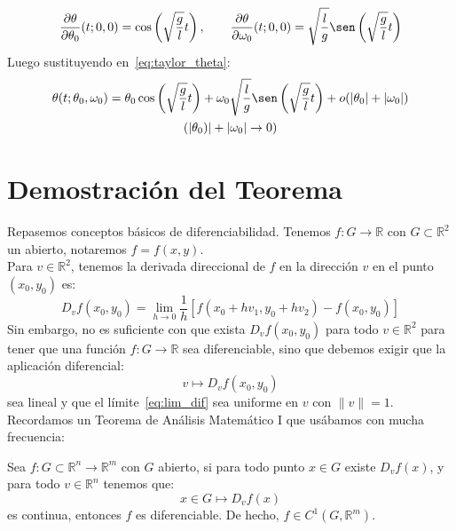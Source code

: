 \begin{equation*}
    \frac{\partial \theta}{\partial \theta_0}(t;0,0) = \cos\left(\sqrt{\frac{g}{l}}t\right), \qquad \frac{\partial \theta}{\partial \omega_0}(t;0,0) = \sqrt{\frac{l}{g}}\sen\left(\sqrt{\frac{g}{l}}t\right)
\end{equation*}
Luego sustituyendo en~\eqref{eq:taylor_theta}:
\begin{multline*}
    \theta(t;\theta_0,\omega_0) = \theta_0\cos\left(\sqrt{\frac{g}{l}}t\right) + \omega_0\sqrt{\frac{l}{g}} \sen\left(\sqrt{\frac{g}{l}}t\right) + o(|\theta_0|+|\omega_0|) \\
    (|\theta_0)| + |\omega_0|\to 0)
\end{multline*}

\section{Demostración del Teorema}
\noindent
Repasemos conceptos básicos de diferenciabilidad. Tenemos $f:G\to \mathbb{R}$ con $G\subset \mathbb{R}^2$ un abierto, notaremos $f=f(x,y)$.\\

\noindent
Para $v\in \mathbb{R}^2$, tenemos la derivada direccional de $f$ en la dirección $v$ en el punto $(x_0,y_0)$ es:
\begin{equation}\label{eq:lim_dif}
    D_vf(x_0,y_0) = \lim_{h\to0}\frac{1}{h}[f(x_0+hv_1,y_0+hv_2)-f(x_0,y_0)] 
\end{equation}
Sin embargo, no es suficiente con que exista $D_vf(x_0,y_0)$ para todo $v\in \mathbb{R}^2$ para tener que una función $f:G\to \mathbb{R}$ sea diferenciable, sino que debemos exigir que la aplicación diferencial:
\begin{equation*}
    v\longmapsto D_vf(x_0,y_0)
\end{equation*}
sea lineal y que el límite~\eqref{eq:lim_dif} sea uniforme en $v$ con $\|v\|=1$.\\ 

\noindent
Recordamos un Teorema de Análisis Matemático I que usábamos con mucha frecuencia:

\begin{teo}
    Sea $f:G\subset \mathbb{R}^n\to \mathbb{R}^m$ con $G$ abierto, si para todo punto $x\in G$ existe $D_vf(x)$, y para todo $v\in \mathbb{R}^n$ tenemos que:
    \begin{equation*}
        x\in G\longmapsto D_vf(x)
    \end{equation*}
    es continua, entonces $f$ es diferenciable. De hecho, $f\in C^1(G,\mathbb{R}^m)$.
\end{teo}~\\

